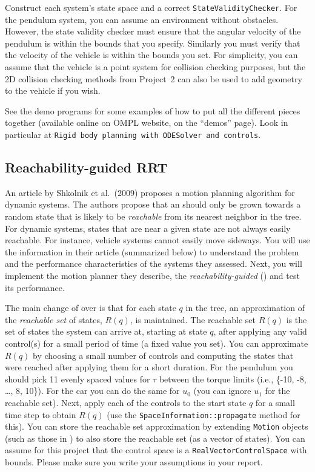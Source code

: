 \documentclass{comp450}
\begin{document}
Construct each system's state space and a correct \texttt{StateValidityChecker}.
For the pendulum system, you can assume an environment without obstacles.
However, the state validity checker must ensure that the angular velocity of the pendulum is within the bounds that you specify.
Similarly you must verify that the velocity of the vehicle is within the bounds you set.
For simplicity, you can assume that the vehicle is a point system for collision checking purposes, but the 2D collision checking methods from Project~2 can also be used to add geometry to the vehicle if you wish.

See the \ompl demo programs for some examples of how to put all the different pieces together (available online on OMPL website, on the ``demos'' page).
Look in particular at \texttt{Rigid body planning with ODESolver and controls}.

\subsection*{Reachability-guided RRT}
An article by Shkolnik et al.\ (2009) proposes a motion planning algorithm for dynamic systems.
The authors propose that an  should only be grown towards a random state that is likely to be \emph{reachable} from its nearest neighbor in the tree.
For dynamic systems, states that are near a given state are not always easily reachable.
For instance, vehicle systems cannot easily move sideways.
You will use the information in their article (summarized below) to understand the problem and the performance characteristics of the systems they assessed.
Next, you will implement the motion planner they describe, the \textit{reachability-guided } () and test its performance.

The main change of  over  is that for each state $q$ in the tree, an approximation of the \emph{reachable set} of states, $R(q)$, is maintained.
The reachable set $R(q)$ is the set of states the system can arrive at, starting at state $q$, after applying any valid control(s) for a small period of time (a fixed value you set).
You can approximate $R(q)$ by choosing a small number of controls and computing the states that were reached after applying them for a short duration.
For the pendulum you should pick 11 evenly spaced values for $\tau$ between the torque limits (i.e., \{-10, -8, \dots, 8, 10\}).
For the car you can do the same for $u_0$ (you can ignore $u_1$ for the reachable set).
Next, apply each of the controls to the start state $q$ for a small time step to obtain $R(q)$ (use the \texttt{SpaceInformation::propagate} method for this).
You can store the reachable set approximation by extending \texttt{Motion} objects (such as those in ) to also store the reachable set (as a vector of states).
You can assume for this project that the control space is a \texttt{RealVectorControlSpace} with bounds.
Please make sure you write your assumptions in your report.
\end{document}
